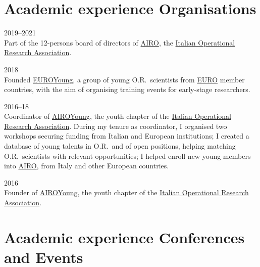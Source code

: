 \section*{Academic experience {\small Organisations}}

\begin{paracol}{2}
  \textsc{2019--2021}
\switchcolumn
  \\
  Part of the 12-persons board of directors of \href{https://www.airo.org/}{AIRO}, the \href{https://www.airo.org/}{Italian Operational Research Association}.
\end{paracol}

\begin{paracol}{2}
  \textsc{2018}
\switchcolumn
  \\
  Founded \href{https://euroyoung.github.io/}{EUROYoung}, a group of young O.R.\ scientists from \href{https://www.euro-online.org}{EURO} member countries, with the aim of organising training events for early-stage researchers.
\end{paracol}

\begin{paracol}{2}
  \textsc{2016--18}
\switchcolumn
  \\
  Coordinator of \href{https://www.airoyoung.org/}{AIROYoung}, the youth chapter of the \href{http://www.airo.org}{Italian Operational Research Association}.
  During my tenure as coordinator, I organised two workshops securing funding from Italian and European institutions;
  I created a database of young talents in O.R.\ and of open positions, helping matching O.R.\ scientists with relevant opportunities;
  I helped enroll new young members into \href{https://www.airo.org/}{AIRO}, from Italy and other European countries.
\end{paracol}

\begin{paracol}{2}
  \textsc{2016}
\switchcolumn
  \\
  Founder of \href{https://www.airoyoung.org}{AIROYoung}, the youth chapter of the \href{http://www.airo.org}{Italian Operational Research Association}.
\end{paracol}

\section*{Academic experience {\small Conferences and Events}}

